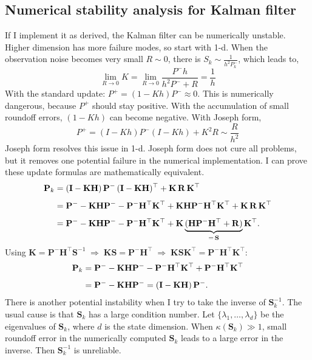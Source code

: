 \documentclass{article}
\begin{document}
\subsection{Numerical stability analysis for Kalman filter}

If I implement it as derived, the Kalman filter can be numerically unstable. Higher dimension has more failure modes, so start with 1-d. When the observation noise becomes very small $R \sim 0$, there is $S_k \sim \frac{1}{h^2 P^-_k}$, which leads to,
\begin{equation}
   \lim_{R\rightarrow 0} K =  \lim_{R\rightarrow 0} \frac{P^- h}{h^2 P^- + R} =  \frac{1}{h}
\end{equation}
With the standard update: $P^+ = (1 - K h) P^- \approx 0$. This is numerically dangerous, because $P^+$ should stay positive. With the accumulation of small roundoff errors, $(1 - K h)$ can become negative. With Joseph form, 
\begin{equation}
    P^+ = (I - K h) P^- (I - K h) + K^2 R \sim \frac{R}{h^2}
\end{equation}
Joseph form resolves this issue in 1-d. Joseph form does not cure all problems, but it removes one potential failure in the numerical implementation. I can prove these update formulas are mathematically equivalent. 
\begin{align}
  \mathbf{P}_k
  &= (\mathbf{I} - \mathbf{K}\mathbf{H})\,\mathbf{P}^-\,
     (\mathbf{I} - \mathbf{K}\mathbf{H})^\top
     + \mathbf{K}\,\mathbf{R}\,\mathbf{K}^\top \notag\\[4pt]
  &= \mathbf{P}^-
     - \mathbf{K}\mathbf{H}\mathbf{P}^-
     - \mathbf{P}^-\mathbf{H}^\top\mathbf{K}^\top
     + \mathbf{K}\mathbf{H}\mathbf{P}^-\mathbf{H}^\top\mathbf{K}^\top
     + \mathbf{K}\,\mathbf{R}\,\mathbf{K}^\top \notag\\[4pt]
  &= \mathbf{P}^-
     - \mathbf{K}\mathbf{H}\mathbf{P}^-
     - \mathbf{P}^-\mathbf{H}^\top\mathbf{K}^\top
     + \mathbf{K}
       \underbrace{(\mathbf{H}\mathbf{P}^-\mathbf{H}^\top + \mathbf{R})}_{=\,\mathbf{S}}
       \mathbf{K}^\top. \notag
\end{align}
Using $\mathbf{K} = \mathbf{P}^-\mathbf{H}^\top\mathbf{S}^{-1}
\;\Longrightarrow\;
\mathbf{K}\mathbf{S} = \mathbf{P}^-\mathbf{H}^\top
\;\Longrightarrow\;
\mathbf{K}\mathbf{S}\mathbf{K}^\top = \mathbf{P}^-\mathbf{H}^\top\mathbf{K}^\top$:
\begin{align}
  \mathbf{P}_k
  &= \mathbf{P}^-
     - \mathbf{K}\mathbf{H}\mathbf{P}^-
     - \mathbf{P}^-\mathbf{H}^\top\mathbf{K}^\top
     + \mathbf{P}^-\mathbf{H}^\top\mathbf{K}^\top \notag\\[4pt]
  &= \mathbf{P}^- - \mathbf{K}\mathbf{H}\mathbf{P}^-
   = (\mathbf{I} - \mathbf{K}\mathbf{H})\,\mathbf{P}^-. \notag
\end{align}
There is another potential instability when I try to take the inverse of $\mathbf{S}^{-1}_k$. The usual cause is that $\mathbf{S}_k$ has a large condition number. Let $\{\lambda_1,\ldots,\lambda_d\}$ be the eigenvalues of $\mathbf{S}_k$, where $d$ is the state dimension. When $\kappa (\mathbf{S}_k) \gg 1$, small roundoff error in the numerically computed $\mathbf{S}_k$ leads to a large error in the inverse. Then $\mathbf{S}^{-1}_k$ is unreliable. 
\end{document}
